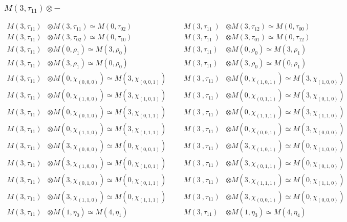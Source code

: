 \subsubsection{$M(3,\tau_{11})\otimes -$}
\begin{align*}
M(3,\tau_{11}) &\otimes M(3,\tau_{11}) \simeq M(0,\tau_{02}) &&& M(3,\tau_{11}\
) &\otimes M(3,\tau_{12}) \simeq M(0,\tau_{00})\\
M(3,\tau_{11}) &\otimes M(3,\tau_{02}) \simeq M(0,\tau_{10}) &&& M(3,\tau_{11}\
) &\otimes M(3,\tau_{01}) \simeq M(0,\tau_{12})\\
M(3,\tau_{11}) &\otimes M(0,\rho_{1}) \simeq M(3,\rho_{0}) &&& M(3,\tau_{11}) \
&\otimes M(0,\rho_{0}) \simeq M(3,\rho_{1})\\
M(3,\tau_{11}) &\otimes M(3,\rho_{1}) \simeq M(0,\rho_{0}) &&& M(3,\tau_{11}) \
&\otimes M(3,\rho_{0}) \simeq M(0,\rho_{1})\\
M(3,\tau_{11}) &\otimes M(0,\chi_{(0,0,0)}) \simeq M(3,\chi_{(0,0,1)}) &&& M(3\
,\tau_{11}) &\otimes M(0,\chi_{(1,0,1)}) \simeq M(3,\chi_{(1,0,0)})\\
M(3,\tau_{11}) &\otimes M(0,\chi_{(1,0,0)}) \simeq M(3,\chi_{(1,0,1)}) &&& M(3\
,\tau_{11}) &\otimes M(0,\chi_{(0,1,1)}) \simeq M(3,\chi_{(0,1,0)})\\
M(3,\tau_{11}) &\otimes M(0,\chi_{(0,1,0)}) \simeq M(3,\chi_{(0,1,1)}) &&& M(3\
,\tau_{11}) &\otimes M(0,\chi_{(1,1,1)}) \simeq M(3,\chi_{(1,1,0)})\\
M(3,\tau_{11}) &\otimes M(0,\chi_{(1,1,0)}) \simeq M(3,\chi_{(1,1,1)}) &&& M(3\
,\tau_{11}) &\otimes M(0,\chi_{(0,0,1)}) \simeq M(3,\chi_{(0,0,0)})\\
M(3,\tau_{11}) &\otimes M(3,\chi_{(0,0,0)}) \simeq M(0,\chi_{(0,0,1)}) &&& M(3\
,\tau_{11}) &\otimes M(3,\chi_{(1,0,1)}) \simeq M(0,\chi_{(1,0,0)})\\
M(3,\tau_{11}) &\otimes M(3,\chi_{(1,0,0)}) \simeq M(0,\chi_{(1,0,1)}) &&& M(3\
,\tau_{11}) &\otimes M(3,\chi_{(0,1,1)}) \simeq M(0,\chi_{(0,1,0)})\\
M(3,\tau_{11}) &\otimes M(3,\chi_{(0,1,0)}) \simeq M(0,\chi_{(0,1,1)}) &&& M(3\
,\tau_{11}) &\otimes M(3,\chi_{(1,1,1)}) \simeq M(0,\chi_{(1,1,0)})\\
M(3,\tau_{11}) &\otimes M(3,\chi_{(1,1,0)}) \simeq M(0,\chi_{(1,1,1)}) &&& M(3\
,\tau_{11}) &\otimes M(3,\chi_{(0,0,1)}) \simeq M(0,\chi_{(0,0,0)})\\
M(3,\tau_{11}) &\otimes M(1,\eta_{0}) \simeq M(4,\eta_{1}) &&& M(3,\tau_{11}) \
&\otimes M(1,\eta_{3}) \simeq M(4,\eta_{4})\\

\end{align*}

